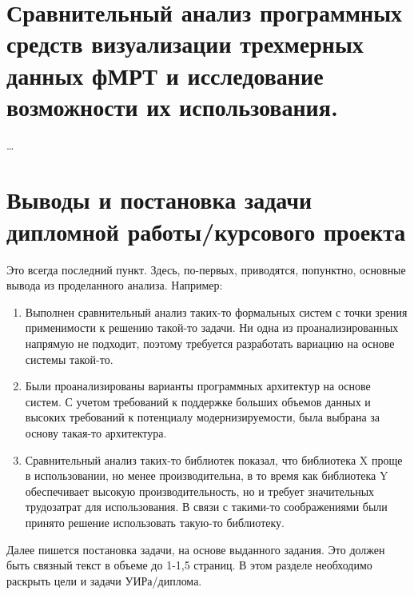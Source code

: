 \section{Сравнительный анализ программных средств визуализации трехмерных данных фМРТ и исследование возможности их использования.}

\dots




\section{Выводы и постановка задачи дипломной работы/курсового проекта}

Это всегда последний пункт. Здесь, по-первых, приводятся, попунктно, основные вывода из проделанного анализа. Например:

\begin{enumerate}
	\item Выполнен сравнительный анализ таких-то формальных систем с точки зрения применимости к решению такой-то задачи. Ни одна из проанализированных напрямую не подходит, поэтому требуется разработать вариацию на основе системы такой-то.
	\item Были проанализированы варианты программных архитектур на основе систем. С учетом требований к поддержке больших объемов данных и высоких требований к потенциалу модернизируемости, была выбрана за основу такая-то архитектура.
	\item Сравнительный анализ таких-то библиотек показал, что библиотека X проще в использовании, но менее производительна, в то время как библиотека Y обеспечивает высокую производительность, но и требует значительных трудозатрат для использования. В связи с такими-то соображениями были принято решение использовать такую-то библиотеку.
\end{enumerate}

Далее пишется постановка задачи, на основе выданного задания. Это должен быть связный текст в объеме до 1-1,5 страниц. В этом разделе необходимо раскрыть цели и задачи УИРа/диплома.